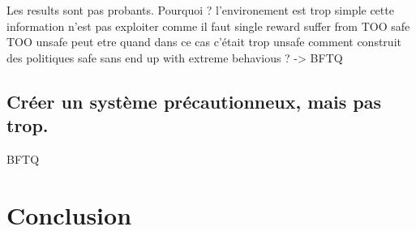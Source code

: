 \documentclass[french]{beamer}
\begin{document}
    \begin{frame}
        Les results sont pas probants.
        Pourquoi ?
            l'environement est trop simple
            cette information n'est pas exploiter comme il faut
                single reward suffer from TOO safe TOO unsafe
                    peut etre quand dans ce cas c'était trop unsafe
                    comment construit des politiques safe sans end up with extreme behavious ? -> BFTQ
    \end{frame}

    \subsection{Créer un système précautionneux, mais pas trop.}

    \begin{frame}

        BFTQ

    \end{frame}

    \section{Conclusion}
    \begin{frame}
    \end{frame}
\end{document}
